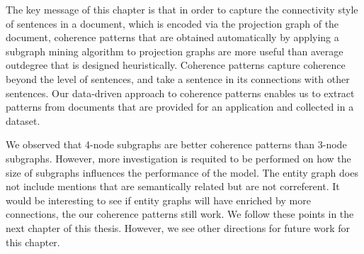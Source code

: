 The key message of this chapter is that in order to capture the connectivity style of sentences in  a document, which is encoded via the projection graph of the document, coherence patterns that are obtained automatically by applying a subgraph mining algorithm to projection graphs are more useful than average outdegree that is designed heuristically. 
Coherence patterns capture coherence beyond the level of sentences, and take a sentence in its connections with other sentences. 
Our \mbox{data-driven} approach to coherence patterns enables us to extract patterns from documents that are provided for an application and collected in a dataset. 

We observed that 4-node subgraphs are better coherence patterns than 3-node subgraphs. 
However, more investigation is requited to be performed on how the size of subgraphs influences the performance of the model. 
The entity graph does not include mentions that are semantically related but are not correferent. 
It would be interesting to see if entity graphs will have enriched by more  connections, the our coherence patterns still work. 
We follow these points in the next chapter of this thesis.  
However, we see other directions for future work for this chapter. 










